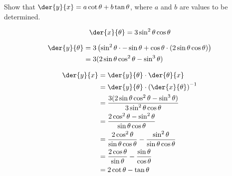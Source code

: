 \documentclass{jhwhw}
\begin{document}
        Show that $\der{y}{x} = a\cot \theta + b\tan \theta$, where $a$ and $b$ are values to be determined.

    \solution
        \begin{equation*}
            \der{x}{\theta} = 3\sin^2\theta\cos\theta
        \end{equation*}

        \begin{align*}
            \der{y}{\theta} &= 3\left(\sin^2\theta \cdot -\sin\theta + \cos\theta \cdot (2\sin\theta\cos\theta) \right)\\
            &= 3(2\sin\theta\cos^2\theta-\sin^3\theta)
        \end{align*}

        \begin{align*}
            \der{y}{x} &= \der{y}{\theta} \cdot \der{\theta}{x}\\
            &= \der{y}{\theta} \cdot \left(\der{x}{\theta}\right)^{-1}\\
            &= \dfrac{3(2\sin\theta\cos^2\theta-\sin^3\theta)}{3\sin^2\theta\cos\theta}\\
            &= \dfrac{2\cos^2\theta-\sin^2\theta}{\sin\theta\cos\theta}\\
            &= \dfrac{2\cos^2\theta}{\sin\theta\cos\theta} - \dfrac{\sin^2\theta}{\sin\theta\cos\theta}\\
            &= \dfrac{2\cos\theta}{\sin\theta} - \dfrac{\sin\theta}{\cos\theta}\\
            &= 2\cot\theta - \tan\theta
        \end{align*}

\end{document}
